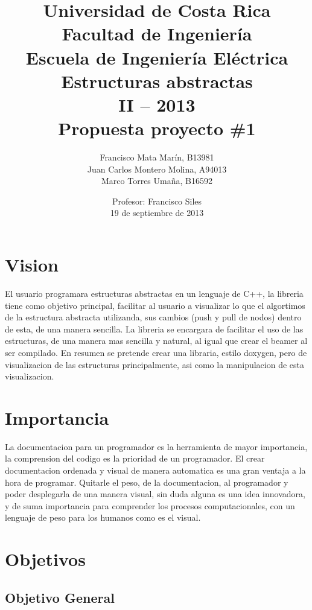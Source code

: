 \documentclass[12pt,letterpaper]{article}     %
\author{Francisco Mata Marín, B13981 \\
		Juan Carlos Montero Molina, A94013 \\
		Marco Torres Umaña, B16592   \vspace {10mm}}
\title{{Universidad de Costa Rica \\ 
		Facultad de Ingeniería \\
		Escuela de Ingeniería Eléctrica \\
		Estructuras abstractas \\
		II – 2013\\  		 
		\vspace* {50mm}			
		 Propuesta proyecto \#1 } \vspace* {50mm}}
\date{Profesor: Francisco Siles\\19 de septiembre de 2013}
\begin{document}
	\maketitle							%
	\newpage





\section{Vision}
 
El usuario programara estructuras abstractas en un lenguaje de C++, la libreria tiene como objetivo principal, facilitar al usuario a visualizar lo que el algortimos de la estructura abstracta utilizanda, sus cambios (push y pull de nodos) dentro de esta, de una manera sencilla. La libreria se encargara de facilitar el uso de las estructuras,  de una manera mas sencilla y natural, al igual que crear el beamer al ser compilado. En resumen se pretende crear una libraria, estilo doxygen, pero de visualizacion de las estructuras principalmente, asi como la manipulacion de esta visualizacion.

\section{Importancia}

La documentacion para un programador es la herramienta de mayor importancia, la comprension del codigo es la prioridad de un programador. El crear documentacion ordenada y visual de manera automatica es una gran ventaja a la hora de programar. Quitarle el peso, de la documentacion, al programador y poder desplegarla de una manera visual, sin duda alguna es una idea innovadora, y de suma importancia para comprender los procesos computacionales, con un lenguaje de peso para los humanos como es el visual.


\section{Objetivos}

\subsection{Objetivo General} 
\end{document}
